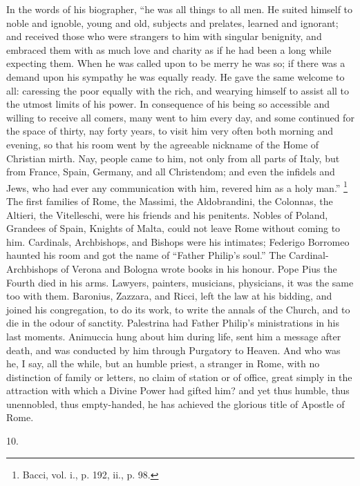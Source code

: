 In the words of his biographer, ``he was all things to all men.
He suited himself to noble and ignoble, young and old, subjects and
prelates, learned and ignorant; and received those who were strangers
to him with singular benignity, and embraced them with as much love
and charity as if he had been a long while expecting them. When
he was called upon to be merry he was so; if there was a demand upon
his sympathy he was equally ready. He gave the same welcome to all:
caressing the poor equally with the rich, and wearying himself to
assist all to the utmost limits of his power. In consequence of his
being so accessible and willing to receive all comers, many went to
him every day, and some continued for the space of thirty, nay forty
years, to visit him very often both morning and evening, so that his
room went by the agreeable nickname of the Home of Christian mirth.
Nay, people came to him, not only from all parts of Italy, but from
France, Spain, Germany, and all Christendom; and even the infidels and
Jews, who had ever any communication with him, revered him as a holy
man.'' \footnote{Bacci, vol. i.,
p. 192, ii., p. 98.} The first families of Rome, the Massimi, the Aldobrandini, the
Colonnas, the Altieri, the Vitelleschi, were his friends and his
penitents. Nobles of Poland, Grandees of Spain, Knights of Malta,
could not leave Rome without coming to him. Cardinals, Archbishops,
and Bishops were his intimates; Federigo Borromeo haunted his room and
got the name of ``Father Philip's soul.'' The
Cardinal-Archbishops of Verona and Bologna wrote books in his honour.
Pope Pius the Fourth died in his arms. Lawyers, painters, musicians,
physicians, it was the same too with them. Baronius, Zazzara, and
Ricci, left the law at his bidding, and joined his congregation, to do
its work, to write the annals of the Church, and to die in the odour
of sanctity. Palestrina had Father Philip's ministrations in his last
moments. Animuccia hung about him during life, sent him a message
after death, and was conducted by him through Purgatory to Heaven. And
who was he, I say, all the while, but an humble priest, a
stranger in Rome, with no distinction of family or letters, no claim
of station or of office, great simply in the attraction with which a
Divine Power had gifted him? and yet thus humble, thus unennobled,
thus empty-handed, he has achieved the glorious title of Apostle of
Rome.

10.

